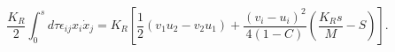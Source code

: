 \begin{equation}
\label{areaaction}
\frac{K_R}{2}\int_0^s d\tau \epsilon_{ij}x_i\dot{x}_j=K_R[\frac{1}{2}(v_1u_2-v_2u_1)+\frac{(v_i-u_i)^2}{4(1-C)}(\frac{K_Rs}{M}-S)].
\end{equation}

